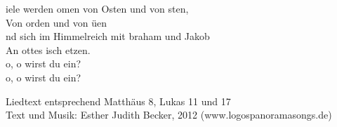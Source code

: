 iele werden omen von Osten und von sten,\\
Von orden und von üen\\
nd sich im Himmelreich mit braham und Jakob\\
An ottes isch etzen.\\

 o, o wirst du ein?\\
 o, o wirst du ein?\\

\begin{footnotesize}
Liedtext entsprechend Matthäus 8, Lukas 11 und 17\\
Text und Musik: Esther Judith Becker, 2012 (www.logospanoramasongs.de)
\end{footnotesize}